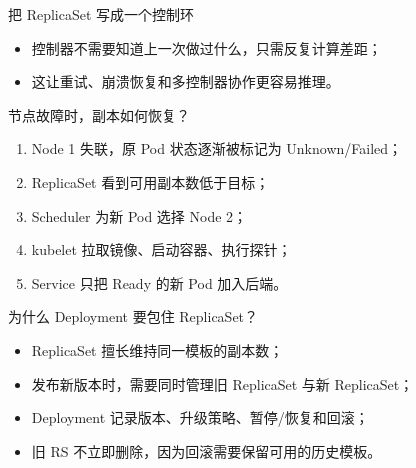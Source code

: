 \documentclass[UTF8,fontset=none,aspectratio=169,10pt]{beamer}
\begin{document}
\begin{frame}{把 ReplicaSet 写成一个控制环}
\begin{center}
\end{center}
\vfill
\begin{itemize}
  \item 控制器不需要知道上一次做过什么，只需反复计算差距；
  \item 这让重试、崩溃恢复和多控制器协作更容易推理。
\end{itemize}
\end{frame}

\begin{frame}{节点故障时，副本如何恢复？}
\begin{enumerate}
  \item Node 1 失联，原 Pod 状态逐渐被标记为 Unknown/Failed；
  \item ReplicaSet 看到可用副本数低于目标；
  \item Scheduler 为新 Pod 选择 Node 2；
  \item kubelet 拉取镜像、启动容器、执行探针；
  \item Service 只把 Ready 的新 Pod 加入后端。
\end{enumerate}
\vfill
{}
\end{frame}

\begin{frame}{为什么 Deployment 要包住 ReplicaSet？}
\begin{itemize}
  \item ReplicaSet 擅长维持同一模板的副本数；
  \item 发布新版本时，需要同时管理旧 ReplicaSet 与新 ReplicaSet；
  \item Deployment 记录版本、升级策略、暂停/恢复和回滚；
  \item 旧 RS 不立即删除，因为回滚需要保留可用的历史模板。
\end{itemize}
\vfill
{}
\end{frame}
\end{document}
